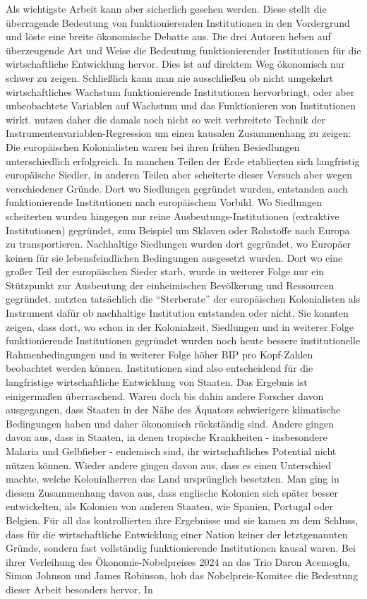 Als wichtigste Arbeit kann aber sicherlich \textcite{Acemoglu2001} gesehen werden. Diese stellt die überragende Bedeutung von funktionierenden Institutionen in den Vordergrund und löste eine breite ökonomische Debatte aus. Die drei Autoren heben auf überzeugende Art und Weise die Bedeutung funktionierender Institutionen für die wirtschaftliche Entwicklung hervor. Dies ist auf direktem Weg ökonomisch nur schwer zu zeigen. Schließlich kann man nie ausschließen ob nicht umgekehrt wirtschaftliches Wachstum funktionierende Institutionen hervorbringt, oder aber unbeobachtete Variablen auf Wachstum und das Funktionieren von Institutionen wirkt. \textcite{Acemoglu2001} nutzen daher die damals noch nicht so weit verbreitete Technik der Instrumentenvariablen-Regression um einen kausalen Zusammenhang zu zeigen: Die europäischen Kolonialisten waren bei ihren frühen Besiedlungen unterschiedlich erfolgreich. In manchen Teilen der Erde etablierten sich langfristig europäische Siedler, in anderen Teilen aber scheiterte dieser Versuch aber wegen verschiedener Gründe. Dort wo Siedlungen gegründet wurden, entstanden auch funktionierende Institutionen nach europäischem Vorbild. Wo Siedlungen scheiterten wurden hingegen nur reine Ausbeutungs-Institutionen (extraktive Institutionen) gegründet, zum Beispiel um Sklaven oder Rohstoffe nach Europa zu transportieren. Nachhaltige Siedlungen wurden dort gegründet, wo Europäer keinen für sie lebensfeindlichen Bedingungen ausgesetzt wurden. Dort wo eine großer Teil der europäischen Sieder starb, wurde in weiterer Folge nur ein Stützpunkt zur Ausbeutung der einheimischen Bevölkerung und Ressourcen gegründet. \textcite{Acemoglu2001} nutzten tatsächlich die "`Sterberate"' der europäischen Kolonialisten als Instrument dafür ob nachhaltige Institution entstanden oder nicht. Sie konnten zeigen, dass dort, wo schon in der Kolonialzeit, Siedlungen und in weiterer Folge funktionierende Institutionen gegründet wurden noch heute bessere institutionelle Rahmenbedingungen und in weiterer Folge höher BIP pro Kopf-Zahlen beobachtet werden können. Institutionen sind also entscheidend für die langfristige wirtschaftliche Entwicklung von Staaten. Das Ergebnis ist einigermaßen überraschend. Waren doch bis dahin andere Forscher davon ausgegangen, dass Staaten in der Nähe des Äquators schwierigere klimatische Bedingungen haben und daher ökonomisch rückständig sind. Andere gingen davon aus, dass in Staaten, in denen tropische Krankheiten - insbesondere Malaria und Gelbfieber - endemisch sind, ihr wirtschaftliches Potential nicht nützen können. Wieder andere gingen davon aus, dass es einen Unterschied machte, welche Kolonialherren das Land ursprünglich besetzten. Man ging in diesem Zusammenhang davon aus, dass englische Kolonien sich später besser entwickelten, als Kolonien von anderen Staaten, wie Spanien, Portugal oder Belgien. Für all das kontrollierten \textcite{Acemoglu2001} ihre Ergebnisse und sie kamen zu dem Schluss, dass für die wirtschaftliche Entwicklung einer Nation keiner der letztgenannten Gründe, sondern fast vollständig funktionierende Institutionen kausal waren. Bei ihrer Verleihung des Ökonomie-Nobelpreises 2024 an das Trio Daron Acemoglu, Simon Johnson und James Robinson, hob das Nobelpreis-Komitee die Bedeutung dieser Arbeit besonders hervor. In 
